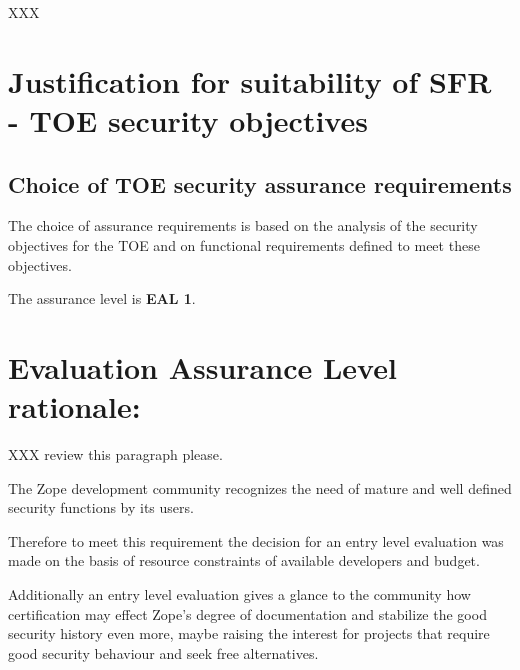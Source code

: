 \documentclass[10pt,a4paper,english]{scrbook}
\begin{document}
XXX



\hypertarget{justification-for-suitability-of-sfr-toe-security-objectives}{}
\section{Justification for suitability of SFR - TOE security objectives}



\hypertarget{choice-of-toe-security-assurance-requirements}{}
\subsection{Choice of TOE security assurance requirements}

The choice of assurance requirements is based on the analysis of the security
objectives for the TOE and on functional requirements defined to meet these
objectives.

The assurance level is \textbf{EAL 1}.



\hypertarget{evaluation-assurance-level-rationale}{}
\section{Evaluation Assurance Level rationale:}

XXX review this paragraph please.

The Zope development community recognizes the need of mature and well defined
security functions by its users.

Therefore to meet this requirement the decision for an entry level evaluation
was made on the basis of resource constraints of available developers and
budget.

Additionally an entry level evaluation gives a glance to the community how
certification may effect Zope's degree of documentation and stabilize the good
security history even more, maybe raising the interest for projects that
require good security behaviour and seek free alternatives.
\end{document}
